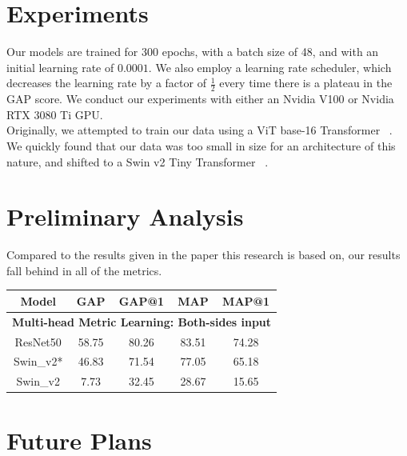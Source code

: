 \documentclass[10pt,twocolumn,letterpaper]{article}
\begin{document}
\section{Experiments}

    
Our models are trained for 300 epochs, with a batch size of 48, and with an initial learning rate of $0.0001$.
We also employ a learning rate scheduler, which decreases the learning rate by a factor of $\frac{1}{2}$ every time there is a plateau in the GAP score.  We conduct our experiments with
 either an Nvidia V100 or Nvidia RTX 3080 Ti GPU.
\\

Originally, we attempted to train our data using a ViT base-16 Transformer ~\cite{an_imageworth}. We quickly found that our data was too small in size for an architecture of this nature, 
and shifted to a Swin v2 Tiny Transformer ~\cite{swinv2}.

\section{Preliminary Analysis}

Compared to the results given in the paper this research is based on, our results fall behind in all of the metrics.   \par

\begin{table}[h]
    \begin{tabular}{@{}|ccccc|@{}}
    \toprule
    \multicolumn{1}{|c|}{Model}     & \multicolumn{1}{c|}{GAP}   & \multicolumn{1}{c|}{GAP@1} & \multicolumn{1}{c|}{MAP}   & MAP@1 \\ \midrule
    \multicolumn{5}{|c|}{\textbf{Multi-head Metric Learning: Both-sides input}}                                                    \\ \midrule
    \multicolumn{1}{|c|}{ResNet50}  & \multicolumn{1}{c|}{58.75} & \multicolumn{1}{c|}{80.26} & \multicolumn{1}{c|}{83.51} & 74.28 \\ \midrule
    \multicolumn{1}{|c|}{Swin\_v2*} & \multicolumn{1}{c|}{46.83} & \multicolumn{1}{c|}{71.54} & \multicolumn{1}{c|}{77.05} & 65.18 \\ \midrule
    \multicolumn{1}{|c|}{Swin\_v2}  & \multicolumn{1}{c|}{7.73}  & \multicolumn{1}{c|}{32.45} & \multicolumn{1}{c|}{28.67} & 15.65 \\ \bottomrule
    \end{tabular}
\end{table}
\newpage
\section{Future Plans}
\end{document}
